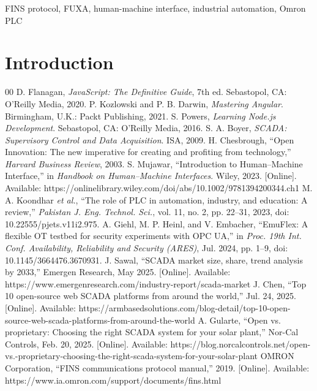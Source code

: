 \documentclass[conference]{IEEEtran}
\begin{document}
\begin{IEEEkeywords}
FINS protocol, FUXA, human-machine interface, industrial automation, Omron PLC
\end{IEEEkeywords}

\section{Introduction}


\begin{thebibliography}{00}
 D. Flanagan, \textit{JavaScript: The Definitive Guide}, 7th ed. Sebastopol, CA: O'Reilly Media, 2020.
 P. Kozlowski and P. B. Darwin, \textit{Mastering Angular}. Birmingham, U.K.: Packt Publishing, 2021.
 S. Powers, \textit{Learning Node.js Development}. Sebastopol, CA: O'Reilly Media, 2016.
 S. A. Boyer, \textit{SCADA: Supervisory Control and Data Acquisition}. ISA, 2009.
 H. Chesbrough, ``Open Innovation: The new imperative for creating and profiting from technology,'' \textit{Harvard Business Review}, 2003.
 S. Mujawar, ``Introduction to Human–Machine Interface,'' in \textit{Handbook on Human–Machine Interfaces}. Wiley, 2023. [Online]. Available: https://onlinelibrary.wiley.com/doi/abs/10.1002/9781394200344.ch1
 M. A. Koondhar \textit{et al.}, ``The role of PLC in automation, industry, and education: A review,'' \textit{Pakistan J. Eng. Technol. Sci.}, vol. 11, no. 2, pp. 22–31, 2023, doi: 10.22555/pjets.v11i2.975.
 A. Giehl, M. P. Heinl, and V. Embacher, ``EmuFlex: A flexible OT testbed for security experiments with OPC UA,'' in \textit{Proc. 19th Int. Conf. Availability, Reliability and Security (ARES)}, Jul. 2024, pp. 1–9, doi: 10.1145/3664476.3670931.
 J. Sawal, ``SCADA market size, share, trend analysis by 2033,'' Emergen Research, May 2025. [Online]. Available: https://www.emergenresearch.com/industry-report/scada-market
 J. Chen, ``Top 10 open-source web SCADA platforms from around the world,'' Jul. 24, 2025. [Online]. Available: https://armbasedsolutions.com/blog-detail/top-10-open-source-web-scada-platforms-from-around-the-world
 A. Gularte, ``Open vs. proprietary: Choosing the right SCADA system for your solar plant,'' Nor-Cal Controls, Feb. 20, 2025. [Online]. Available: https://blog.norcalcontrols.net/open-vs.-proprietary-choosing-the-right-scada-system-for-your-solar-plant
 OMRON Corporation, ``FINS communications protocol manual,'' 2019. [Online]. Available: https://www.ia.omron.com/support/documents/fins.html

\end{thebibliography}
\end{document}
